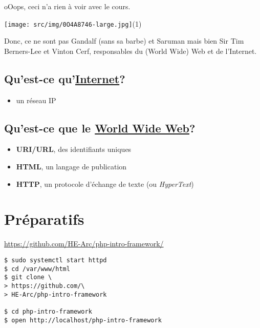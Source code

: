 oOops, ceci n'a rien à voir avec le cours.

\texttt{[image: src/img/0O4A8746-large.jpg]}(1)

Donc, ce ne sont pas Gandalf (sans sa barbe) et Saruman mais bien Sir
Tim Berners-Lee et Vinton Cerf, responsables du (World Wide) Web et de
l'Internet.

\hypertarget{quest-ce-quinternet}{%
\subsection{\texorpdfstring{Qu'est-ce
qu'\href{https://www.youtube.com/watch?v=iDbyYGrswtg}{Internet}?}{Qu'est-ce qu'Internet?}}\label{quest-ce-quinternet}}

\begin{itemize}
\tightlist
\item
  un réseau IP
\end{itemize}

\hypertarget{quest-ce-que-le-world-wide-web}{%
\subsection{\texorpdfstring{Qu'est-ce que le
\href{http://line-mode.cern.ch/www/hypertext/WWW/TheProject.html}{World
Wide
Web}?}{Qu'est-ce que le World Wide Web?}}\label{quest-ce-que-le-world-wide-web}}

\begin{itemize}
\tightlist
\item
  \textbf{URI/URL}, des identifiants uniques
\item
  \textbf{HTML}, un langage de publication
\item
  \textbf{HTTP}, un protocole d'échange de texte (ou \emph{HyperText})
\end{itemize}

\hypertarget{pruxe9paratifs}{%
\section{Préparatifs}\label{pruxe9paratifs}}

\href{https://github.com/HE-Arc/php-intro-framework}{https://github.com/HE-Arc/php-intro-framework/}

\begin{otherlanguage}{english}

\begin{verbatim}
$ sudo systemctl start httpd
$ cd /var/www/html
$ git clone \
> https://github.com/\
> HE-Arc/php-intro-framework

$ cd php-intro-framework
$ open http://localhost/php-intro-framework
\end{verbatim}

\end{otherlanguage}

